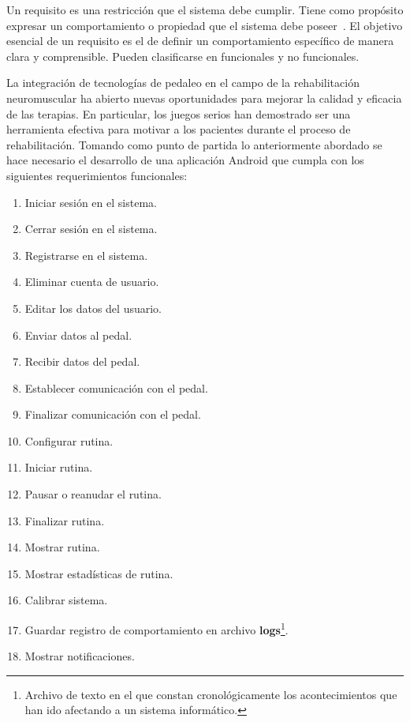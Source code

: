 \newpage
{}
Un requisito es una restricción que el sistema debe cumplir. Tiene como propósito expresar un comportamiento o propiedad que el sistema debe poseer~\cite{jacobson2000uml}. El objetivo esencial de un requisito es el de definir un comportamiento específico de manera clara y comprensible. Pueden clasificarse en funcionales y no funcionales.

La integración de tecnologías de pedaleo en el campo de la rehabilitación neuromuscular ha abierto nuevas oportunidades para mejorar la calidad y eficacia de las terapias. En particular, los juegos serios han demostrado ser una herramienta efectiva para motivar a los pacientes durante el proceso de rehabilitación. Tomando como punto de partida lo anteriormente abordado se hace necesario el desarrollo de una aplicación Android que cumpla con los siguientes requerimientos funcionales:    

\begin{enumerate}
    \item Iniciar sesión en el sistema.
    \item Cerrar sesión en el sistema.
    \item Registrarse en el sistema.
    \item Eliminar cuenta de usuario.
    \item Editar los datos del usuario.
    \item Enviar datos al pedal.
    \item Recibir datos del pedal.
    \item Establecer comunicación con el pedal.
    \item Finalizar comunicación con el pedal.
    \item Configurar rutina.
    \item Iniciar rutina.
    \item Pausar o reanudar el rutina.
    \item Finalizar rutina.
    \item Mostrar rutina.
    \item Mostrar estadísticas de rutina.
    \item Calibrar sistema.
    \item Guardar registro de comportamiento en archivo \textbf{logs}\footnote{Archivo de texto en el que constan cronológicamente los acontecimientos que han ido afectando a un sistema informático.}.
    \item Mostrar notificaciones.
\end{enumerate}


